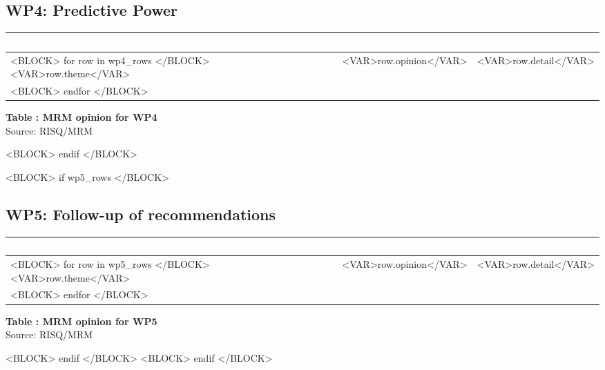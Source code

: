\documentclass[10pt, a4paper]{article}
\newcounter{tableCounter}
\begin{document}
\subsection{WP4: Predictive Power}
\noindent\begin{tabularx}{\textwidth}{|>{\centering\arraybackslash}p{3.5cm}|>{\centering\arraybackslash}p{3.5cm}|X|}
\hline
\rowcolor{sgred}
\centering\textcolor{white}{\textbf{Theme}} & \centering\textcolor{white}{\textbf{MRM opinion}} & \centering\arraybackslash\textcolor{white}{\textbf{Detail}} \\
\hline
<BLOCK> for row in wp4_rows </BLOCK>
<VAR>row.theme</VAR> & <VAR>row.opinion</VAR> & <VAR>row.detail</VAR> \\
\hline
<BLOCK> endfor </BLOCK>
\end{tabularx}
\begin{center}
\scriptsize \textbf{Table \thetableCounter: MRM opinion for WP4} \\
Source: RISQ/MRM
\end{center}
\vspace{0.3cm}
<BLOCK> endif </BLOCK>

<BLOCK> if wp5_rows </BLOCK>
\subsection{WP5: Follow-up of recommendations}
\noindent\begin{tabularx}{\textwidth}{|>{\centering\arraybackslash}p{3.5cm}|>{\centering\arraybackslash}p{3.5cm}|X|}
\hline
\rowcolor{sgred}
\centering\textcolor{white}{\textbf{Theme}} & \centering\textcolor{white}{\textbf{MRM opinion}} & \centering\arraybackslash\textcolor{white}{\textbf{Detail}} \\
\hline
<BLOCK> for row in wp5_rows </BLOCK>
<VAR>row.theme</VAR> & <VAR>row.opinion</VAR> & <VAR>row.detail</VAR> \\
\hline
<BLOCK> endfor </BLOCK>
\end{tabularx}
\begin{center}
\scriptsize \textbf{Table \thetableCounter: MRM opinion for WP5} \\
Source: RISQ/MRM
\end{center}
<BLOCK> endif </BLOCK>
<BLOCK> endif </BLOCK>
\end{document}
